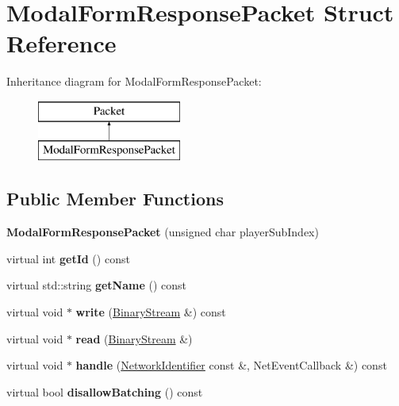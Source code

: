 \hypertarget{struct_modal_form_response_packet}{}\section{Modal\+Form\+Response\+Packet Struct Reference}
\label{struct_modal_form_response_packet}
Inheritance diagram for Modal\+Form\+Response\+Packet\+:\begin{figure}[H]
\begin{center}
\leavevmode
\includegraphics[height=2.000000cm]{struct_modal_form_response_packet}
\end{center}
\end{figure}
\subsection*{Public Member Functions}
\begin{DoxyCompactItemize}
\item 
\mbox{\label{struct_modal_form_response_packet_abd8152c9db848137d9db22bc8ebc0820}} 
{\bfseries Modal\+Form\+Response\+Packet} (unsigned char player\+Sub\+Index)
\item 
\mbox{\label{struct_modal_form_response_packet_acd7bb3016c90cafe489aa31352058bac}} 
virtual int {\bfseries get\+Id} () const
\item 
\mbox{\label{struct_modal_form_response_packet_a19bb5e40ffcdc58055a4d128c16d23b8}} 
virtual std\+::string {\bfseries get\+Name} () const
\item 
\mbox{\label{struct_modal_form_response_packet_a9af3ba51842d3dedf784138acc500522}} 
virtual void $\ast$ {\bfseries write} (\mbox{\hyperlink{struct_binary_stream}{Binary\+Stream}} \&) const
\item 
\mbox{\label{struct_modal_form_response_packet_abc58bbba50344916133703bb34087650}} 
virtual void $\ast$ {\bfseries read} (\mbox{\hyperlink{struct_binary_stream}{Binary\+Stream}} \&)
\item 
\mbox{\label{struct_modal_form_response_packet_a2f591d7505b7ecf17df9a79fe6ebcce3}} 
virtual void $\ast$ {\bfseries handle} (\mbox{\hyperlink{struct_network_identifier}{Network\+Identifier}} const \&, Net\+Event\+Callback \&) const
\item 
\mbox{\label{struct_modal_form_response_packet_a0e9e033c7fb5e8a755c48b91ab3a172d}} 
virtual bool {\bfseries disallow\+Batching} () const
\end{DoxyCompactItemize}

